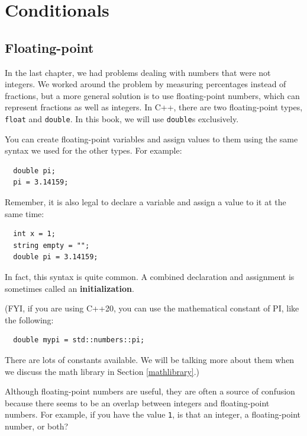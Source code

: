 

\chapter{Conditionals}
\label{conditional}

\section{Floating-point}
\label{floating-point}

In the last chapter, we had problems dealing with numbers
that were not integers.  We worked around the problem by measuring
percentages instead of fractions, but a more general solution is
to use floating-point numbers, which can represent fractions
as well as integers.  In C++, there are two floating-point types,
{\tt float} and {\tt double}.  In this book, we will use
{\tt double}s exclusively.

You can create floating-point variables and assign values to them
using the same syntax we used for the other types.  For example:

\begin{lstlisting}
  double pi;
  pi = 3.14159;
\end{lstlisting}
%
Remember, it is also legal to declare a variable and assign a value to it at the
same time:

\begin{lstlisting}
  int x = 1;
  string empty = "";
  double pi = 3.14159;
\end{lstlisting}
%
In fact, this syntax is quite common.  A combined declaration
and assignment is sometimes called an {\bf initialization}.

(FYI, if you are using C++20, you can use the mathematical
constant of PI, like the following:
\begin{lstlisting}
  double mypi = std::numbers::pi;
\end{lstlisting}
There are lots of constants available. We will be talking 
more about them when we discuss the math library in Section \ref{mathlibrary}.)


Although floating-point numbers are useful, they are
often a source of confusion because there seems to be an
overlap between integers and floating-point numbers.  For
example, if you have the value {\tt 1}, is that an integer,
a floating-point number, or both?

